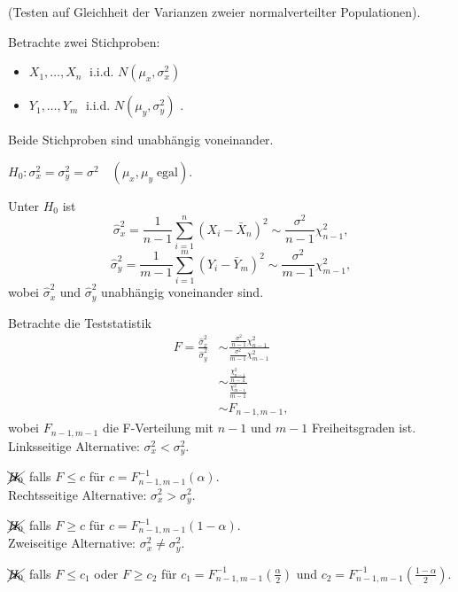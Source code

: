 \documentclass{tstextbook}
\begin{document}
\begin{example}
	(Testen auf Gleichheit der Varianzen zweier normalverteilter Populationen).
	
	Betrachte zwei Stichproben:
		\begin{itemize}
		\item $ X_1,\ldots,X_n \;$ i.i.d. $ N\left(\mu_x, \sigma_x^2\right) $ 
		\item $ Y_1,\ldots,Y_m \;$ i.i.d. $ N\left(\mu_y, \sigma_y^2\right) $ .
	\end{itemize}
	Beide Stichproben sind unabhängig voneinander.
	
	$ H_0 \colon \sigma_x^2 = \sigma_y^2 = \sigma^2 \quad (\mu_x,\mu_y \; \text{egal}) $.
	
	Unter $ H_0 $ ist 
	\[ 
	\hat{\sigma}_x^2 = \frac{1}{n-1}\sum_{i=1}^{n}(X_i-\bar{X}_n)^2 \sim \frac{\sigma^2}{n-1}\chi^2_{n-1} ,
	\]
		\[ 
	\hat{\sigma}_y^2 = \frac{1}{m-1}\sum_{i=1}^{m}(Y_i-\bar{Y}_m)^2 \sim \frac{\sigma^2}{m-1}\chi^2_{m-1} ,
	\] wobei $ \hat{\sigma}_x^2 $ und $ \hat{\sigma}_y^2 $ unabhängig voneinander sind.
	
	Betrachte die Teststatistik 
	\[
	\begin{aligned}
		F = \frac{\hat{\sigma}_x^2}{\hat{\sigma}_y^2} & \sim \frac{\frac{\sigma^2}{n-1}\chi^2_{n-1}}{\frac{\sigma^2}{m-1}\chi^2_{m-1}} \\
		& \sim \frac{\frac{\chi^2_{n-1}}{n-1}}{\frac{\chi^2_{m-1}}{m-1}} \\
		& \sim F_{n-1,m-1}, 
	\end{aligned}
	\] wobei $ F_{n-1,m-1} $ die F-Verteilung mit $ n-1 $ und $ m-1 $ Freiheitsgraden ist. \\
	
	Linksseitige Alternative: $ \sigma_x^2 < \sigma_y^2 $. 
	
	$ \xcancel{H_0} $ falls $ F \le c $ für $ c = F_{n-1,m-1}^{-1} \left(\alpha\right) $. \\
	
	Rechtsseitige Alternative: $ \sigma_x^2 > \sigma_y^2 $. 
	
	$ \xcancel{H_0} $ falls $ F \ge c $ für $ c = F_{n-1,m-1}^{-1} \left(1-\alpha\right) $. \\
	
	Zweiseitige Alternative: $ \sigma_x^2 \ne \sigma_y^2 $. 
	
	$ \xcancel{H_0} $ falls $ F \le c_1 $ oder $ F \ge c_2 $ für $ c_1 = F_{n-1,m-1}^{-1} \left(\frac{\alpha}{2}\right) $ und $ c_2 = F_{n-1,m-1}^{-1} \left(\frac{1-\alpha}{2}\right) $. \\
	

\end{example}
\end{document}
